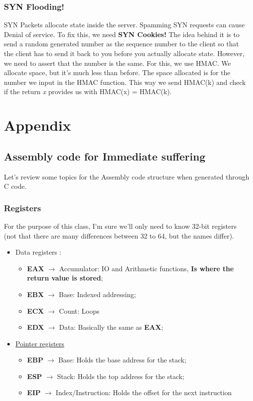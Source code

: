 \documentclass[11pt]{article}
\begin{document}
{\subsubsection{SYN Flooding!}
\label{sec:org8cff39e}
SYN Packets allocate state inside the server. Spamming SYN requests can cause Denial of service. To fix this, we need \textbf{SYN Cookies!} The idea behind it is to send a random generated number as the sequence number to the client so that the client has to send it back to you before you actually allocate state. However, we need to assert that the number is the same. For this, we use HMAC. We allocate space, but it's much less than before. The space allocated is for the number we input in the HMAC function. This way we send HMAC(k) and check if the return \emph{x} provides us with HMAC(x) = HMAC(k).  

\section{Appendix}
\label{sec:org03f4e1b}
\subsection{Assembly code for Immediate suffering}
\label{sec:orgdeb804f}
\label{sec:Assemble}
Let's review some topics for the Assembly code structure when generated through C code.
\subsubsection{Registers}
\label{sec:orga050830}
For the purpose of this class, I'm sure we'll only need to know 32-bit registers (not that there are many differences between 32 to 64, but the names differ).
\begin{itemize}
\item Data registers \cite{evans_guide_nodate}:
\begin{itemize}
\item \textbf{EAX} \(\to\) Accumulator: IO and Arithmetic functions, \textbf{Is where the return value is stored};
\item \textbf{EBX} \(\to\) Base: Indexed addressing;
\item \textbf{ECX} \(\to\) Count: Loops
\item \textbf{EDX} \(\to\) Data: Basically the same as \textbf{EAX};
\end{itemize}
\item \hyperref[StackReg]{Pointer registers}
\begin{itemize}
\item \textbf{EBP} \(\to\) Base: Holds the base address for the stack;
\item \textbf{ESP} \(\to\) Stack: Holds the top address for the stack;
\item \textbf{EIP} \(\to\) Index/Instruction: Holds the offset for the next instruction
\end{itemize}
\end{itemize}

}
\end{document}
